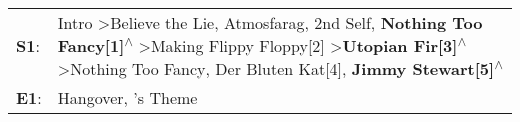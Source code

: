 \begin{supertabular}{p{0.03\textwidth}p{0.92\textwidth}}
 \textbf{S1}:  &  Intro\textsuperscript{} \textgreater \enspace Believe the Lie\textsuperscript{}, \enspace Atmosfarag\textsuperscript{}, \enspace 2nd Self\textsuperscript{}, \enspace \textbf{Nothing Too Fancy[1]\textsuperscript{$\wedge$}} \textgreater \enspace Making Flippy Floppy[2]\textsuperscript{} \textgreater \enspace \textbf{Utopian Fir[3]\textsuperscript{$\wedge$}} \textgreater \enspace Nothing Too Fancy\textsuperscript{}, \enspace Der Bluten Kat[4]\textsuperscript{}, \enspace \textbf{Jimmy Stewart[5]\textsuperscript{$\wedge$}}  \enspace  \\
 \textbf{E1}:  &                                                                                                                                                                                                                                                                                                                                                                                                                                                                            Hangover\textsuperscript{}, 's Theme\textsuperscript{}  \enspace  \\
\end{supertabular}
